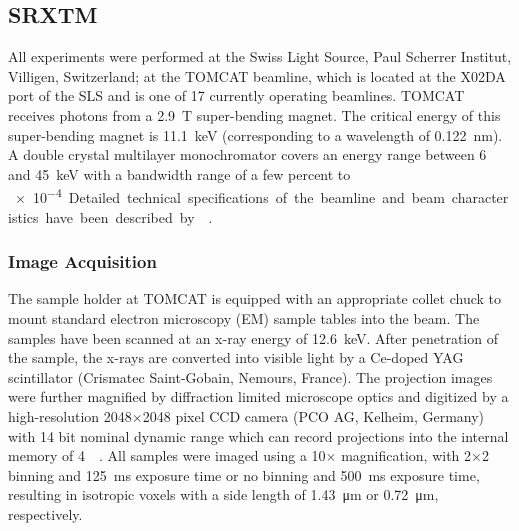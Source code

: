 \subsection{SRXTM}
All experiments were performed at the Swiss Light Source, Paul Scherrer Institut, Villigen, Switzerland; at the TOMCAT beamline, which is located at the X02DA port of the SLS and is one of 17 currently operating beamlines. TOMCAT receives photons from a \SI{2.9}{\tesla} super-bending magnet. The critical energy of this super-bending magnet is \SI{11.1}{\kilo\electronvolt} (corresponding to a wavelength of \SI{0.122}{\nano\meter}). A double crystal multilayer monochromator covers an energy range between 6 and \SI{45}{\kilo\electronvolt} with a bandwidth range of a few percent to \SI{e-4}. Detailed technical specifications of the beamline and beam characteristics have been described by~\citeauthor{Stampanoni2006a}~\cite{Stampanoni2006a,Stampanoni2007}.

\subsubsection{Image Acquisition}
\label{seq:Image Acquisition}
The sample holder at TOMCAT is equipped with an appropriate collet chuck to mount standard electron microscopy (EM) sample tables into the beam. The samples have been scanned at an x-ray energy of \SI{12.6}{\kilo\electronvolt}. After penetration of the sample, the x-rays are converted into visible light by a Ce-doped YAG scintillator (Crismatec Saint-Gobain, Nemours, France). The projection images were further magnified by diffraction limited microscope optics and digitized by a high-resolution 2048$\times$2048 pixel CCD camera (PCO AG, Kelheim, Germany) with 14 bit nominal dynamic range which can record projections into the internal memory of \SI{4}{\giga\byte}. All samples were imaged using a 10$\times$ magnification, with 2$\times$2 binning and \SI{125}{\milli\second} exposure time or no binning and \SI{500}{\milli\second} exposure time, resulting in isotropic voxels with a side length of \SI{1.43}{\micro\meter} or \SI{0.72}{\micro\meter}, respectively.

